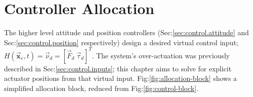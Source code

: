 \chapter{Controller Allocation}
\label{ch:allocation}
The higher level attitude and position controllers (Sec:\ref{sec:control.attitude} and Sec:\ref{sec:control.position} respectively) design a desired virtual control input; $H(\vec{\mathbf{x}}_e,t)=\vec{\nu}_d=[\vec{F}_d~\vec{\tau}_d]^T$. The system's over-actuation was previously described in Sec:\ref{sec:control.inputs}; this chapter aims to solve for explicit actuator positions from that virtual input. Fig:\ref{fig:allocation-block} shows a simplified allocation block, reduced from Fig:\ref{fig:control-block}.
